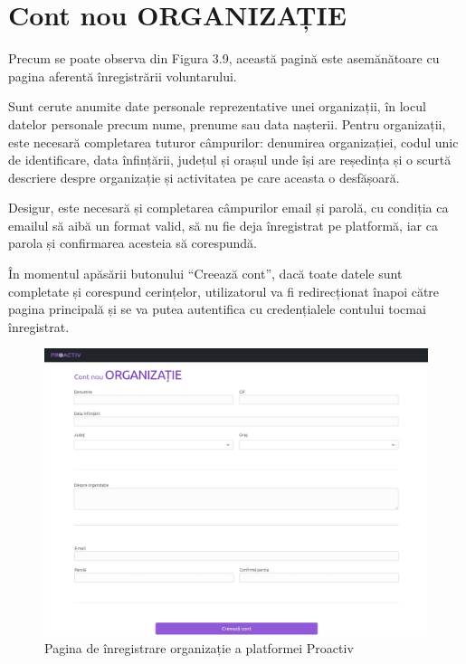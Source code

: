\documentclass[12pt,a4paper]{report}
\begin{document}
\section{Cont nou ORGANIZAȚIE}
\par
Precum se poate observa din Figura 3.9, această pagină este asemănătoare cu pagina aferentă înregistrării voluntarului.
\\\par
Sunt cerute anumite date personale reprezentative unei organizații, în locul datelor personale precum nume, prenume sau data nașterii. Pentru organizații, este necesară completarea tuturor câmpurilor: denumirea organizației, codul unic de identificare, data înfințării, județul și orașul unde își are reședința și o scurtă descriere despre organizație și activitatea pe care aceasta o desfășoară.
\\\par
Desigur, este necesară și completarea câmpurilor email și parolă, cu condiția ca emailul să aibă un format valid, să nu fie deja înregistrat pe platformă, iar ca parola și confirmarea acesteia să corespundă.
\\\par
În momentul apăsării butonului “Creează cont”, dacă toate datele sunt completate și corespund cerințelor, utilizatorul va fi redirecționat înapoi către pagina principală și se va putea autentifica cu credențialele contului tocmai înregistrat.
\\
\begin{figure}[H]
\centering
  \includegraphics[width=1\linewidth]{./imagini/contorg.jpg}
  \caption{Pagina de înregistrare organizație a platformei Proactiv}
\end{figure}
\end{document}

